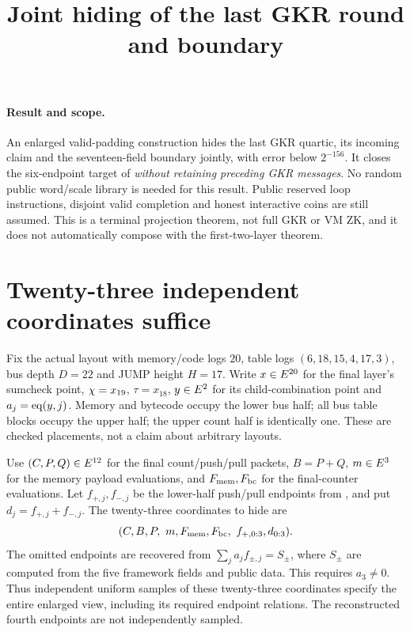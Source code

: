 \documentclass[11pt]{article}
\title{Joint hiding of the last GKR round and boundary}
\author{}
\date{}
\begin{document}
\maketitle
\vspace{-2em}

\paragraph{Result and scope.} An enlarged valid-padding construction hides the last GKR quartic, its incoming claim and the seventeen-field boundary jointly, with error below $2^{-156}$. It closes the six-endpoint target of  \emph{without retaining preceding GKR messages}. No random public word/scale library is needed for this result. Public reserved loop instructions, disjoint valid completion and honest interactive coins are still assumed. This is a terminal projection theorem, not full GKR or VM ZK, and it does not automatically compose with the first-two-layer theorem.

\section{Twenty-three independent coordinates suffice}

Fix the actual layout with memory/code logs $20$, table logs $(6,18,15,4,17,3)$, bus depth $D=22$ and JUMP height $H=17$. Write $x\in E^{20}$ for the final layer's sumcheck point, $\chi=x_{19}$, $\tau=x_{18}$, $y\in E^2$ for its child-combination point and $a_j=\operatorname{eq}(y,j)$. Memory and bytecode occupy the lower bus half; all bus table blocks occupy the upper half; the upper count half is identically one. These are checked placements, not a claim about arbitrary layouts.

Use $(C,P,Q)\in E^{12}$ for the final count/push/pull packets, $B=P+Q$, $m\in E^3$ for the memory payload evaluations, and $F_{\rm mem},F_{\rm bc}$ for the final-counter evaluations. Let $f_{+,j},f_{-,j}$ be the lower-half push/pull endpoints from , and put $d_j=f_{+,j}+f_{-,j}$. The twenty-three coordinates to hide are
\[
 (C,B,P,\ m,F_{\rm mem},F_{\rm bc},\ f_{+,0:3},d_{0:3}).
\]
The omitted endpoints are recovered from $\sum_j a_j f_{\pm,j}=S_\pm$, where $S_\pm$ are computed from the five framework fields and public data. This requires $a_3\ne0$. Thus independent uniform samples of these twenty-three coordinates specify the entire enlarged view, including its required endpoint relations. The reconstructed fourth endpoints are not independently sampled.
\end{document}
